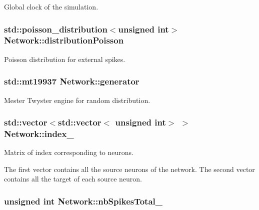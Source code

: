 Global clock of the simulation. 

\hypertarget{classNetwork_a41d662a681a79785a86849fdc0a1657f}{
\subsubsection[{distribution\-Poisson}]{\setlength{\rightskip}{0pt plus 5cm}std\-::poisson\-\_\-distribution$<$unsigned int$>$ Network\-::distribution\-Poisson\hspace{0.3cm}{\ttfamily [private]}}}\label{classNetwork_a41d662a681a79785a86849fdc0a1657f}


Poisson distribution for external spikes. 

\hypertarget{classNetwork_a248c1c21424237413df17ba518c61f31}{
\subsubsection[{generator}]{\setlength{\rightskip}{0pt plus 5cm}std\-::mt19937 Network\-::generator\hspace{0.3cm}{\ttfamily [private]}}}\label{classNetwork_a248c1c21424237413df17ba518c61f31}


Mester Twyster engine for random distribution. 

\hypertarget{classNetwork_ac1a1521c153f98e81c3fc57c09e29435}{
\subsubsection[{index\-\_\-}]{\setlength{\rightskip}{0pt plus 5cm}std\-::vector$<$std\-::vector$<$ unsigned int$>$ $>$ Network\-::index\-\_\-\hspace{0.3cm}{\ttfamily [private]}}}\label{classNetwork_ac1a1521c153f98e81c3fc57c09e29435}


Matrix of index corresponding to neurons. 

The first vector contains all the source neurons of the network. The second vector contains all the target of each source neuron. \hypertarget{classNetwork_a22d94d85ea0c01409d600907976ab699}{
\subsubsection[{nb\-Spikes\-Total\-\_\-}]{\setlength{\rightskip}{0pt plus 5cm}unsigned int Network\-::nb\-Spikes\-Total\-\_\-\hspace{0.3cm}{\ttfamily [private]}}}\label{classNetwork_a22d94d85ea0c01409d600907976ab699}


